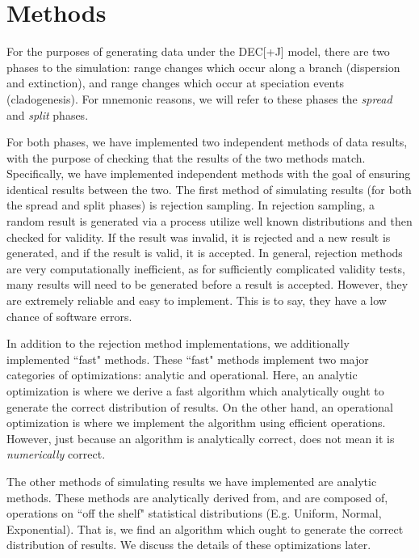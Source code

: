 \documentclass[a4paper]{article}
\begin{document}
\section{Methods}

For the purposes of generating data under the DEC[+J] model, there are two phases to the simulation: range changes which
occur along a branch (dispersion and extinction), and range changes which occur at speciation events (cladogenesis).
For mnemonic reasons, we will refer to these phases the \textit{spread} and \textit{split} phases.

For both phases, we have implemented two independent methods of data results, with the purpose of checking that the
results of the two methods match. 
Specifically, we have implemented independent methods with the goal of ensuring identical results between the two.
The first method of simulating results (for both the spread and split phases) is rejection sampling.
In rejection sampling, a random result is generated via a process utilize well known distributions and then checked for
validity.
If the result was invalid, it is rejected and a new result is generated, and if the result is valid, it is accepted.
In general, rejection methods are very computationally inefficient, as for sufficiently complicated validity tests, many
results will need to be generated before a result is accepted.
However, they are extremely reliable and easy to implement.
This is to say, they have a low chance of software errors.

In addition to the rejection method implementations, we additionally implemented 
``fast" methods.
These ``fast" methods implement two major categories of optimizations: analytic
and operational.
Here, an analytic optimization is where we derive a fast algorithm which
analytically ought to generate the correct distribution of results.
On the other hand, an operational optimization is where we implement the
algorithm using efficient operations.
However, just because an algorithm is analytically correct, does not mean it is
\textit{numerically} correct\cite{goldberg_what_1991, noauthor_ieee_1985}.

The other methods of simulating results we have implemented are analytic
methods.
These methods are analytically derived from, and are composed of, operations on
``off the shelf" statistical distributions (E.g. Uniform, Normal, Exponential).
That is, we find an algorithm which ought to generate the correct distribution
of results.
We discuss the details of these optimizations later.
\end{document}
